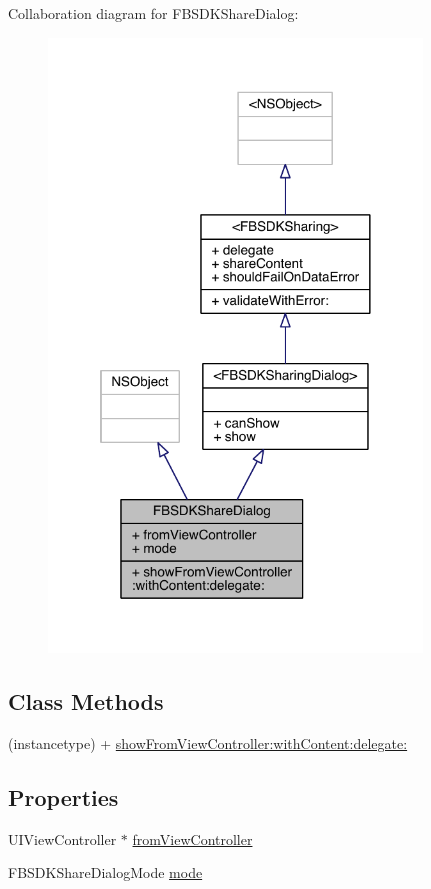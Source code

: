 Collaboration diagram for F\-B\-S\-D\-K\-Share\-Dialog\-:
\nopagebreak
\begin{figure}[H]
\begin{center}
\leavevmode
\includegraphics[width=281pt]{interface_f_b_s_d_k_share_dialog__coll__graph}
\end{center}
\end{figure}
\subsection*{Class Methods}
\begin{DoxyCompactItemize}
\item 
(instancetype) + \hyperlink{interface_f_b_s_d_k_share_dialog_a782dfa1147814c5769cdb7b9d32e058d}{show\-From\-View\-Controller\-:with\-Content\-:delegate\-:}
\end{DoxyCompactItemize}
\subsection*{Properties}
\begin{DoxyCompactItemize}
\item 
U\-I\-View\-Controller $\ast$ \hyperlink{interface_f_b_s_d_k_share_dialog_a1319782aa7ce9db59c35ac6a9bb9a2c9}{from\-View\-Controller}
\item 
F\-B\-S\-D\-K\-Share\-Dialog\-Mode \hyperlink{interface_f_b_s_d_k_share_dialog_a2fa09cba91a90a644c2cd8dd26de372d}{mode}
\end{DoxyCompactItemize}
